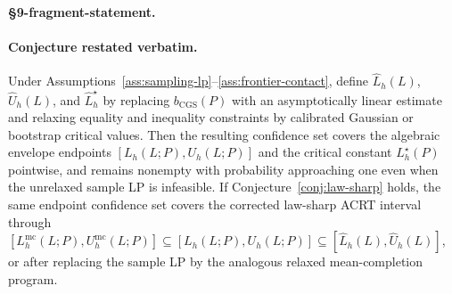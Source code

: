 
\paragraph{\S9-fragment-statement.}
\paragraph{Conjecture restated verbatim.}
Under Assumptions~\ref{ass:sampling-lp}--\ref{ass:frontier-contact}, define
\(\widehat L_h(L)\), \(\widehat U_h(L)\), and
\(\widehat L_h^\star\) by replacing \(b_{\mathrm{CGS}}(P)\) with an
asymptotically linear estimate and relaxing equality and inequality
constraints by calibrated Gaussian or bootstrap critical values.  Then the
resulting confidence set covers the algebraic envelope endpoints
\([L_h(L;P),U_h(L;P)]\) and the critical constant \(L_h^\star(P)\) pointwise,
and remains nonempty with probability approaching one even when the unrelaxed
sample LP is infeasible.  If Conjecture~\ref{conj:law-sharp} holds, the same
endpoint confidence set covers the corrected law-sharp ACRT interval through
\([L_h^{\mathrm{mc}}(L;P),U_h^{\mathrm{mc}}(L;P)]\subseteq[L_h(L;P),U_h(L;P)]\subseteq[\widehat L_h(L),\widehat U_h(L)]\), or after replacing the sample LP by the analogous relaxed mean-completion program.


